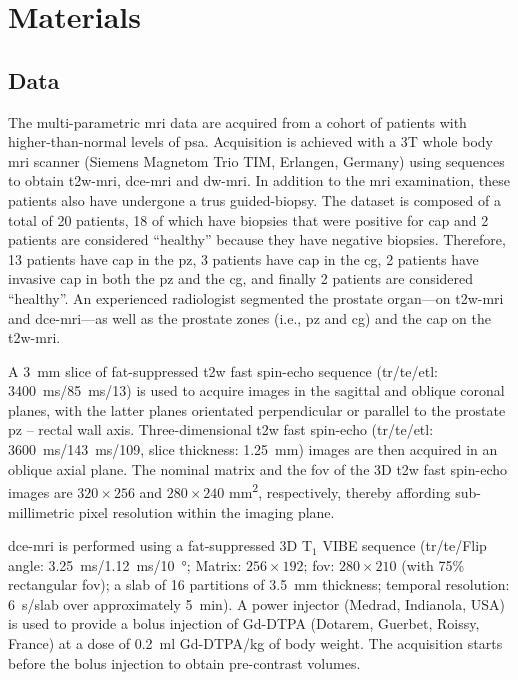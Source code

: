 \section{Materials}\label{sec:materials}

\subsection{Data}\label{sec:data}

The multi-parametric \ac{mri} data are acquired from a cohort of patients with higher-than-normal levels of \ac{psa}.
Acquisition is achieved with a 3T whole body \ac{mri} scanner (Siemens Magnetom Trio TIM, Erlangen, Germany) using sequences to obtain \ac{t2w}-\ac{mri}, \ac{dce}-\ac{mri} and \ac{dw}-\ac{mri}.
In addition to the \ac{mri} examination, these patients also have
undergone a \ac{trus} guided-biopsy.
The dataset is composed of a total of 20 patients, 18 of which have
biopsies that were positive for \ac{cap} and 2 patients are considered
``healthy'' because they have negative biopsies.
Therefore, 13 patients have \ac{cap} in the \ac{pz}, 3 patients have
\ac{cap} in the \ac{cg}, 2 patients have invasive \ac{cap} in both the
\ac{pz} and the \ac{cg}, and finally 2 patients are considered ``healthy''.
An experienced radiologist segmented the prostate organ---on
\ac{t2w}-\ac{mri} and \ac{dce}-\ac{mri}---as well as the prostate
zones (i.e., \ac{pz} and \ac{cg}) and the \ac{cap} on the \ac{t2w}-\ac{mri}.

A \SI{3}{\mm} slice of fat-suppressed \ac{t2w} fast spin-echo sequence
(\ac{tr}/\ac{te}/\ac{etl}: \SI{3400}{\ms}/\SI{85}{\ms}/13) is used to
acquire images in the sagittal and oblique coronal planes, with the latter planes orientated perpendicular or parallel to the prostate \ac{pz} – rectal wall axis.
Three-dimensional \ac{t2w} fast spin-echo (\ac{tr}/\ac{te}/\ac{etl}: \SI{3600}{\ms}/\SI{143}{\ms}/109, slice thickness: \SI{1.25}{\mm}) images are then acquired in an oblique axial plane.
The nominal matrix and the \ac{fov} of the 3D \ac{t2w} fast spin-echo images are $320 \times 256$ and $280 \times 240$ mm\textsuperscript{2}, respectively, thereby affording sub-millimetric pixel resolution within the imaging plane.

\ac{dce}-\ac{mri} is performed using a fat-suppressed 3D T$_1$ VIBE
sequence (\ac{tr}/\ac{te}/Flip angle:
\SI{3.25}{\ms}/\SI{1.12}{\ms}/\SI{10}{\degree}; Matrix: $256 \times
192$; \ac{fov}: $280 \times 210$ (with 75\% rectangular \ac{fov}); a slab of 16 partitions of \SI{3.5}{\mm} thickness; temporal resolution: \SI{6}{\s}/slab over approximately \SI{5}{\minute}).
A power injector (Medrad, Indianola, USA) is used to provide a bolus
injection of Gd-DTPA (Dotarem, Guerbet, Roissy, France) at a dose of
\SI{0.2}{\ml} Gd-DTPA/kg of body weight.
The acquisition starts before the bolus injection to obtain
  pre-contrast volumes.

